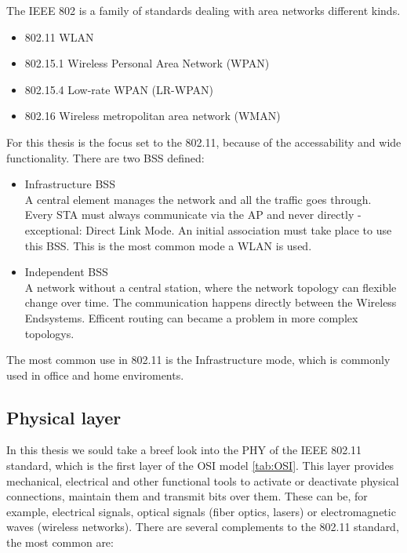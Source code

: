 The \ac{IEEE} 802 is a family of standards dealing with area networks different kinds.
\begin{itemize}
	\item 802.11 \ac{WLAN}
	\item 802.15.1 Wireless Personal Area Network (WPAN)
	\item 802.15.4 Low-rate WPAN (LR-WPAN)
	\item 802.16 Wireless metropolitan area network (WMAN)
\end{itemize}

For this thesis is the focus set to the 802.11, because of the accessability and wide functionality.
There are two \ac{BSS} defined:
\begin{itemize}
	\label{itm:bss}
	\item Infrastructure BSS\\
	A central element manages the network and all the traffic goes through. 
	Every \ac{STA} must always communicate via the \ac{AP} and never directly - exceptional: Direct Link Mode.
	An initial association must take place to use this \ac{BSS}.
	This is the most common mode a \ac{WLAN} is used.
	\item Independent BSS\\
	A network without a central station, where the network topology can flexible change over time.
	The communication happens directly between the Wireless Endsystems.
	Efficent routing can became a problem in more complex topologys.
\end{itemize}
The most common use in 802.11 is the Infrastructure mode, which is commonly used in office and home enviroments.\\ 

\subsection*{Physical layer}

In this thesis we sould take a breef look into the \ac{PHY} of the IEEE 802.11 standard, which is the first layer of the OSI model \ref{tab:OSI}.
This layer provides mechanical, electrical and other functional tools to activate or deactivate physical connections, maintain them and transmit bits over them. 
These can be, for example, electrical signals, optical signals (fiber optics, lasers) or electromagnetic waves (wireless networks).
There are several complements to the 802.11 standard, the most common are:

